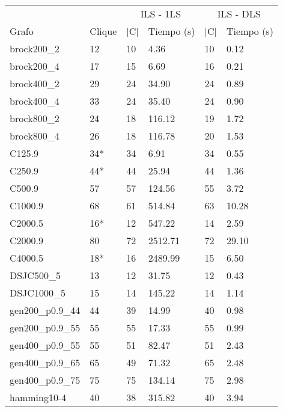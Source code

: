 \begin{small}
\begin{longtable}{l l l l l l}
  \label{table:ils}\\
    & & \multicolumn{2}{c}{ILS - 1LS} & \multicolumn{2}{c}{ILS - DLS} \\ \cline{3-6}
    Grafo              & Clique & |C| & Tiempo (s) & |C| & Tiempo (s) \\ \hline
    \endhead
    \endfoot
    brock200\_2        & 12 & 10 & 4.36 & 10 & 0.12\\ \hline
    brock200\_4        & 17 & 15 & 6.69 & 16 & 0.21\\ \hline
    brock400\_2        & 29 & 24 & 34.90 & 24 & 0.89\\ \hline
    brock400\_4        & 33 & 24 & 35.40 & 24 & 0.90\\ \hline
    brock800\_2        & 24 & 18 & 116.12 & 19 & 1.72\\ \hline
    brock800\_4        & 26 & 18 & 116.78 & 20 & 1.53\\ \hline
    C125.9             & 34* & 34 & 6.91 & 34 & 0.55\\ \hline
    C250.9             & 44* & 44 & 25.94 & 44 & 1.36\\ \hline
    C500.9             & 57 & 57 & 124.56 & 55 & 3.72\\ \hline
    C1000.9            & 68 & 61 & 514.84 & 63 & 10.28\\ \hline
    C2000.5            & 16* & 12 & 547.22 & 14 & 2.59\\ \hline
    C2000.9            & 80 & 72 & 2512.71 & 72 & 29.10\\ \hline
    C4000.5            & 18* & 16 & 2489.99 & 15 & 6.50\\ \hline
    DSJC500\_5         & 13 & 12 & 31.75 & 12 & 0.43\\ \hline
    DSJC1000\_5        & 15 & 14 & 145.22 & 14 & 1.14\\ \hline
    gen200\_p0.9\_44   & 44 & 39 & 14.99 & 40 & 0.98\\ \hline
    gen200\_p0.9\_55   & 55 & 55 & 17.33 & 55 & 0.99\\ \hline
    gen400\_p0.9\_55   & 55 & 51 & 82.47 & 51 & 2.43 \\ \hline
    gen400\_p0.9\_65   & 65 & 49 & 71.32 & 65 & 2.48 \\ \hline
    gen400\_p0.9\_75   & 75 & 75 & 134.14 & 75 & 2.98 \\ \hline
    hamming10-4        & 40 & 38 & 315.82 & 40 & 3.94\\ \hline

\end{longtable}
\end{small}
